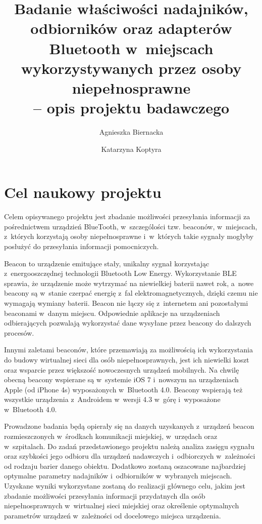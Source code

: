 \documentclass[a4paper]{article}
\begin{document}
\title{Badanie właściwości nadajników, odbiorników oraz adapterów Bluetooth w~miejscach wykorzystywanych przez osoby niepełnosprawne \\-- opis projektu badawczego}
\author{Agnieszka Biernacka \and Katarzyna Koptyra}
\maketitle

\section{Cel naukowy projektu}
Celem opisywanego projektu jest zbadanie możliwości przesyłania informacji za pośrednictwem urządzień BlueTooth, w~szczególości tzw. beaconów, w~miejscach, z~których korzystają osoby niepełnosprawne i~w~których takie sygnały mogłyby posłużyć do przesyłania informacji pomocniczych. 

Beacon to urządzenie emitujące stały, unikalny sygnał korzystając z~energooszczędnej technologii Bluetooth Low Energy. Wykorzystanie BLE sprawia, że urządzenie może wytrzymać na niewielkiej baterii nawet rok, a~nowe beacony są w~stanie czerpać energię z~fal elektromagnetycznych, dzięki czemu nie wymagają wymiany baterii.
Beacon nie łączy się z~internetem ani pozostałymi beaconami w~danym miejscu. Odpowiednie aplikacje na urządzeniach odbierających  pozwalają wykorzystać dane wysyłane przez beacony do dalszych procesów.

Innymi zaletami beaconów, które przemawiają za możliwością ich wykorzystania do budowy wirtualnej sieci dla osób niepełnosprawnych, jest ich niewielki koszt oraz wsparcie przez większość nowoczesnych urządzeń mobilnych. Na chwilę obecną beacony wspierane są w~systemie iOS 7 i~nowszym na urządzeniach Apple (od iPhone 4s) wyposażonych w~Bluetooth 4.0. Beacony wspierają też wszystkie urządzenia z~Androidem w~wersji 4.3 w~górę i~wyposażone w~Bluetooth 4.0.

Prowadzone badania będą opierały się na danych uzyskanych z~urządzeń beacon rozmieszczonych w~środkach komunikacji miejskiej, w~urzędach oraz w~szpitalach. Do zadań przedstawionego projektu należą analiza zasięgu sygnału oraz szybkości jego odbioru dla urządzeń nadawczych i~odbiorczych w~zależności od rodzaju barier danego obiektu. Dodatkowo zostaną oszacowane najbardziej optymalne parametry nadajników i~odbiorników w~wybranych miejscach. Uzyskane wyniki wykorzystane zostaną do realizacji głównego celu, jakim jest zbadanie możliwości przesyłania informacji przydatnych dla osób niepełnosprawnych w~wirtualnej sieci miejskiej oraz określenie optymalnych parametrów urządzeń w~zależności od docelowego miejsca urządzenia.
\end{document}
